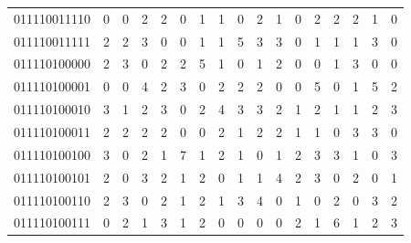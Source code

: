 \documentclass[10pt,a4paper]{article}
\begin{document}
\begin{longtable}{ |c|c|c|c|c|c|c|c|c|c|c|c|c|c|c|c|c| }
    011110011110              & 0                            & 0                                & 2                            & 2                              & 0   & 1   & 1   & 0   & 2   & 1   & 0   & 2   & 2   & 2   & 1   & 0   \\
    011110011111              & 2                            & 2                                & 3                            & 0                              & 0   & 1   & 1   & 5   & 3   & 3   & 0   & 1   & 1   & 1   & 3   & 0   \\
    011110100000              & 2                            & 3                                & 0                            & 2                              & 2   & 5   & 1   & 0   & 1   & 2   & 0   & 0   & 1   & 3   & 0   & 0   \\
    011110100001              & 0                            & 0                                & 4                            & 2                              & 3   & 0   & 2   & 2   & 2   & 0   & 0   & 5   & 0   & 1   & 5   & 2   \\
    011110100010              & 3                            & 1                                & 2                            & 3                              & 0   & 2   & 4   & 3   & 3   & 2   & 1   & 2   & 1   & 1   & 2   & 3   \\
    011110100011              & 2                            & 2                                & 2                            & 2                              & 0   & 0   & 2   & 1   & 2   & 2   & 1   & 1   & 0   & 3   & 3   & 0   \\
    011110100100              & 3                            & 0                                & 2                            & 1                              & 7   & 1   & 2   & 1   & 0   & 1   & 2   & 3   & 3   & 1   & 0   & 3   \\
    011110100101              & 2                            & 0                                & 3                            & 2                              & 1   & 2   & 0   & 1   & 1   & 4   & 2   & 3   & 0   & 2   & 0   & 1   \\
    011110100110              & 2                            & 3                                & 0                            & 2                              & 1   & 2   & 1   & 3   & 4   & 0   & 1   & 0   & 2   & 0   & 3   & 2   \\
    011110100111              & 0                            & 2                                & 1                            & 3                              & 1   & 2   & 0   & 0   & 0   & 0   & 2   & 1   & 6   & 1   & 2   & 3   \\

\end{longtable}
\end{document}

